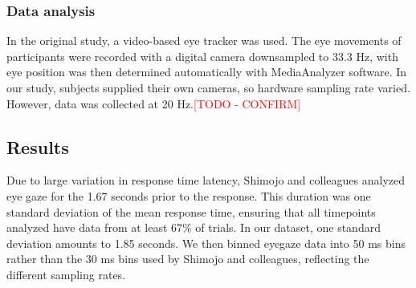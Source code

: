 \documentclass[
  man,floatsintext]{apa6}
\begin{document}
\subsubsection{Data analysis}\label{data-analysis}

In the original study, a video-based eye tracker was used. The eye
movements of participants were recorded with a digital camera
downsampled to 33.3 Hz, with eye position was then determined
automatically with MediaAnalyzer software. In our study, subjects
supplied their own cameras, so hardware sampling rate varied. However,
data was collected at 20 Hz.\textcolor{red}{[TODO - CONFIRM]}

\subsection{Results}\label{results-4}

Due to large variation in response time latency, Shimojo and colleagues analyzed eye gaze for the 1.67 seconds prior to the response. This duration was one standard deviation of the mean response time, ensuring that all timepoints analyzed have data from at least 67\% of trials. In our dataset, one standard deviation amounts to 1.85 seconds. We then binned eyegaze data into 50 ms bins rather than the 30 ms bins used by Shimojo and colleagues, reflecting the different sampling rates.
\end{document}
